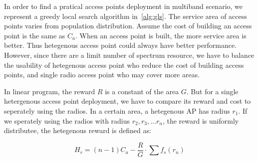 In order to find a pratical access points deployment in multiband scenario, we represent 
a greedy local search algorithm in~\ref{alg:gls}. The service area of access points varies 
from population distribution. Assume the cost of building an access point is the same as $C_a$. 
When an access point is built, the more service area is better. Thus hetegenous access point
could always have better performance. However, since there are a limit number of spectrum resource,
we have to balance the usability of hetegenous access point who reduce the cost of building access 
points, and single radio access point who may cover more areas.

In linear program, the reward $R$ is a constant of the area $G$. But for a single hetergenous access
point deployment, we have to compare its reward and cost to seperately using the radios.
In a certain area, a hetegenous AP has radius $r_1$. If we sperately using the radios with
radius $r_2,r_3,\dots r_n$, the reward is uniformly distributee, the hetegenous reward is defined as:

\begin{equation}
\label{eq:unitprice}
H_r=(n-1) C_a - \frac{R}{G}\cdot\sum f_s(r_n)
\end{equation}

